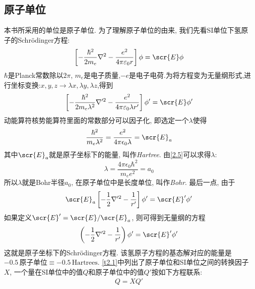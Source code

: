 \subsection{原子单位}
\label{sec2.1.1}
本书所采用的单位是原子单位. 
为了理解原子单位的由来,
我们先看SI单位下氢原子的Schr\"odinger方程:
\begin{align}
\label{2.3}
\left[-\frac{\hbar^2}{2m_e}\nabla^2-\frac{e^2}{4\pi\varepsilon_0r}\right]\phi=\scr{E}\phi
\end{align}
$ \hbar $是Planck常数除以$ 2\pi $, $ m_e $是电子质量,$ -e $是电子电荷.为将方程变为无量纲形式,进行坐标变换:$x,y,z\to\lambda x,\lambda y,\lambda z$,得到
\begin{equation}
\label{2.4}
\left[-\frac{\hbar^2}{2m_e\lambda^2}\nabla'^2-\frac{e^2}{4\pi\varepsilon_0\lambda r'}\right]\phi'=\scr{E}\phi'
\end{equation}
动能算符核势能算符里面的常数部分可以因子化,
即选定一个$ \lambda $使得
\begin{equation}
\label{2.5}
\frac{\hbar^2}{m_e\lambda^2}=\frac{e^2}{4\pi\epsilon_0\lambda}=\scr{E}_a
\end{equation}
其中$ \scr{E}_a $就是原子坐标下的能量,
叫作\emph{Hartree}.
由\autoref{2.5}可以求得$ \lambda $:
\begin{equation}
\label{2.6}
\lambda=\frac{4\pi\epsilon_0\hbar^2}{m_ee^2}=a_0
\end{equation}
所以$ \lambda $就是Bohr半径$ a_0 $,
在原子单位中是长度单位,
叫作\emph{Bohr}.
最后一点,
由于
\begin{equation}
\scr{E}_a\left[-\frac{1}{2}\nabla'^2-\frac{1}{r'}\right]\phi'=\scr{E}'\phi'	
\end{equation}
如果定义$ \scr{E}'=\scr{E}/\scr{E}_a $,
则可得到无量纲的方程
\begin{equation}
\left(-\frac{1}{2}\nabla'^2-\frac{1}{r'}\right)\phi'=\scr{E}'\phi'
\end{equation}
这就是原子坐标下的Schr\"odinger方程.
该氢原子方程的基态解对应的能量是$-0.5\,\text{原子单位}\equiv -0.5\,\text{Hartrees}$. 
\autoref{t2.1}中列出了原子单位和SI单位之间的转换因子$ X $,
一个量在SI单位中的值$ Q $和原子单位中的值$ Q' $按如下方程联系:
\begin{eqnarray}
\label{2.9}
Q=XQ'
\end{eqnarray}

